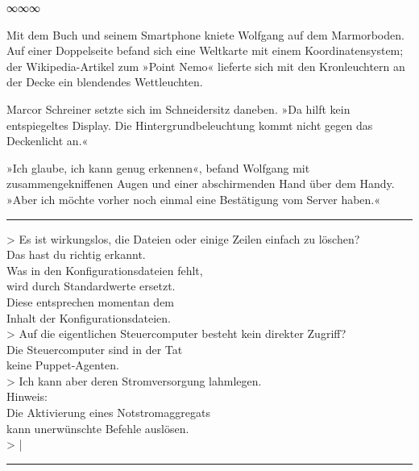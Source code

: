 \begin{center}
∞∞∞
\end{center}

Mit dem Buch und seinem Smartphone kniete Wolfgang auf dem Marmorboden. Auf einer Doppelseite befand sich eine Weltkarte mit einem Koordinatensystem; der Wikipedia-Artikel zum »Point Nemo« lieferte sich mit den Kronleuchtern an der Decke ein blendendes Wettleuchten.

Marcor Schreiner setzte sich im Schneidersitz daneben. »Da hilft kein entspiegeltes Display. Die Hintergrundbeleuchtung kommt nicht gegen das Deckenlicht an.«

»Ich glaube, ich kann genug erkennen«, befand Wolfgang mit zusammengekniffenen Augen und einer abschirmenden Hand über dem Handy. »Aber ich möchte vorher noch einmal eine Bestätigung vom Server haben.«

\noindent \parbox{\textwidth}{ \vspace{3ex} \hrule \vspace{3ex}

    \begin{tiny}
    \begin{ttfamily}

\noindent > Es ist wirkungslos, die Dateien oder einige Zeilen einfach zu löschen?\\
\noindent Das hast du richtig erkannt.\\
\noindent Was in den Konfigurationsdateien fehlt,\\
\noindent wird durch Standardwerte ersetzt.\\
\noindent Diese entsprechen momentan dem\\
\noindent Inhalt der Konfigurationsdateien.\\
\noindent > Auf die eigentlichen Steuercomputer besteht kein direkter Zugriff?\\
\noindent Die Steuercomputer sind in der Tat\\
\noindent keine Puppet-Agenten.\\
\noindent > Ich kann aber deren Stromversorgung lahmlegen.\\
\noindent Hinweis:\\
\noindent Die Aktivierung eines Notstromaggregats\\
\noindent kann unerwünschte Befehle auslösen.\\
\noindent > |

    \end{ttfamily}
    \end{tiny}

\vspace{3ex} \hrule \vspace{3ex} }

